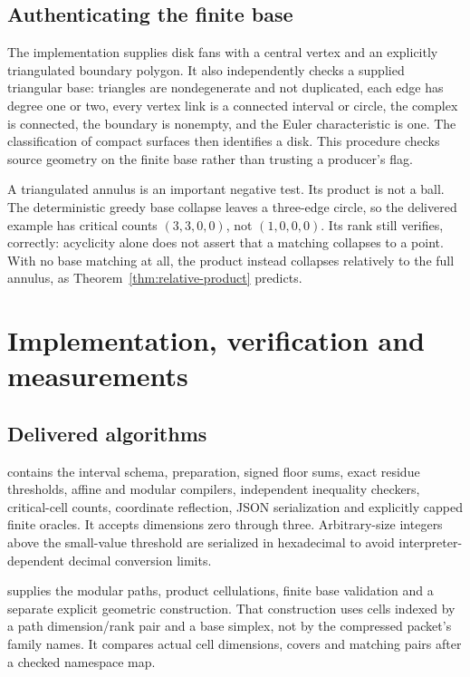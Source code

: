 \documentclass[11pt,letterpaper]{article}
\theoremstyle{definition}
\theoremstyle{remark}\newtheorem{remark}[theorem]{Remark}
\newcommand{\code}[1]{\texttt{\detokenize{#1}}}
\begin{document}
\subsection{Authenticating the finite base}

The implementation supplies disk fans with a central vertex and an explicitly triangulated boundary polygon. It also independently checks a supplied triangular base: triangles are nondegenerate and not duplicated, each edge has degree one or two, every vertex link is a connected interval or circle, the complex is connected, the boundary is nonempty, and the Euler characteristic is one. The classification of compact surfaces then identifies a disk. This procedure checks source geometry on the finite base rather than trusting a producer's \code{is_disk} flag.

A triangulated annulus is an important negative test. Its product is not a ball. The deterministic greedy base collapse leaves a three-edge circle, so the delivered example has critical counts $(3,3,0,0)$, not $(1,0,0,0)$. Its rank still verifies, correctly: acyclicity alone does not assert that a matching collapses to a point. With no base matching at all, the product instead collapses relatively to the full annulus, as Theorem~\ref{thm:relative-product} predicts.

\section{Implementation, verification and measurements}
\label{sec:implementation}

\subsection{Delivered algorithms}

\code{code/ranked_morse.py} contains the interval schema, preparation, signed floor sums, exact residue thresholds, affine and modular compilers, independent inequality checkers, critical-cell counts, coordinate reflection, JSON serialization and explicitly capped finite oracles. It accepts dimensions zero through three. Arbitrary-size integers above the small-value threshold are serialized in hexadecimal to avoid interpreter-dependent decimal conversion limits.

\code{code/sources.py} supplies the modular paths, product cellulations, finite base validation and a separate explicit geometric construction. That construction uses cells indexed by a path dimension/rank pair and a base simplex, not by the compressed packet's family names. It compares actual cell dimensions, covers and matching pairs after a checked namespace map.
\end{document}
